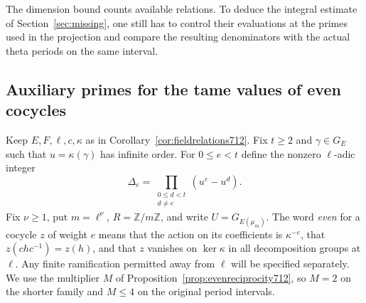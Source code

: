 \documentclass[a4paper,11pt]{article}
\theoremstyle{definition}
\theoremstyle{remark}
\newcommand{\ZZ}{\mathbb Z}\newcommand{\ord}{\operatorname{ord}}
\numberwithin{equation}{section}
\begin{document}
The dimension bound counts available relations. To deduce the
integral estimate of Section~\ref{sec:missing}, one still has
to control their evaluations at the primes used in the
projection and compare the resulting denominators with the
actual theta periods on the same interval.
\clearpage


\subsection{Auxiliary primes for the tame values of even cocycles}
\label{sec:triangularprimes713}

Keep \(E,F,\ell,c,\kappa\) as in
Corollary~\ref{cor:fieldrelations712}. Fix \(t\ge2\) and
\(\gamma\in G_E\) such that \(u=\kappa(\gamma)\) has infinite order.
For \(0\le e<t\) define the nonzero \(\ell\)-adic integer
\[
        \Delta_e=\prod_{\substack{0\le d<t\\d\ne e}}(u^e-u^d).
\]
Fix \(\nu\ge1\), put \(m=\ell^\nu\), \(R=\ZZ/m\ZZ\), and write
\(U=G_{E(\mu_m)}\). The word \emph{even} for a cocycle \(z\) of
weight \(e\) means that the action on its coefficients is
\(\kappa^{-e}\), that \(z(chc^{-1})=z(h)\), and that \(z\)
vanishes on \(\ker\kappa\) in all decomposition groups at
\(\ell\). Any finite ramification permitted away from \(\ell\)
will be specified separately. We use the multiplier \(M\) of
Proposition~\ref{prop:evenreciprocity712}, so \(M=2\) on the
shorter family and \(M\le4\) on the original period intervals.
\end{document}
